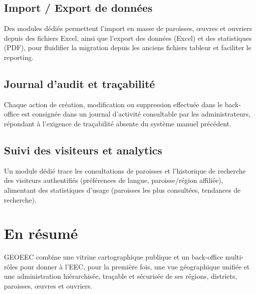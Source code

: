 \documentclass[11pt, a4paper]{article}
\begin{document}
\subsection{Import / Export de données}
Des modules dédiés permettent l'import en masse de paroisses, œuvres et ouvriers depuis des
fichiers Excel, ainsi que l'export des données (Excel) et des statistiques (PDF), pour
fluidifier la migration depuis les anciens fichiers tableur et faciliter le reporting.

\subsection{Journal d'audit et traçabilité}
Chaque action de création, modification ou suppression effectuée dans le back-office est
consignée dans un journal d'activité consultable par les administrateurs, répondant à
l'exigence de traçabilité absente du système manuel précédent.

\subsection{Suivi des visiteurs et analytics}
Un module dédié trace les consultations de paroisses et l'historique de recherche des
visiteurs authentifiés (préférences de langue, paroisse/région affiliée), alimentant des
statistiques d'usage (paroisses les plus consultées, tendances de recherche).

\section*{En résumé}

GEOEEC combine une vitrine cartographique publique et un back-office multi-rôles pour
donner à l'EEC, pour la première fois, une vue géographique unifiée et une administration
hiérarchisée, traçable et sécurisée de ses régions, districts, paroisses, œuvres et
ouvriers.
\end{document}
